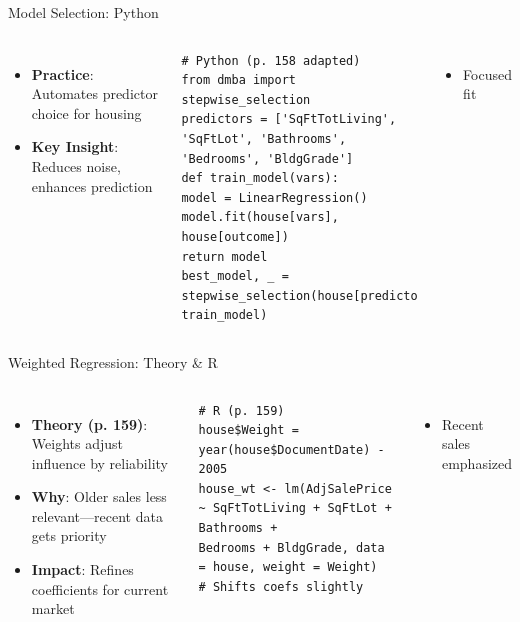 \documentclass{beamer}
\begin{document}
	\begin{frame}[fragile]{Model Selection: Python}
		\lstset{language=Python}
		\begin{columns}
			\begin{itemize}
				\item \textbf{Practice}: Automates predictor choice for housing
				\item \textbf{Key Insight}: Reduces noise, enhances prediction
			\end{itemize}
			\begin{lstlisting}
# Python (p. 158 adapted)
from dmba import stepwise_selection
predictors = ['SqFtTotLiving', 'SqFtLot', 'Bathrooms', 'Bedrooms', 'BldgGrade']
def train_model(vars):
model = LinearRegression()
model.fit(house[vars], house[outcome])
return model
best_model, _ = stepwise_selection(house[predictors].columns, train_model)
			\end{lstlisting}
			\begin{itemize}
				\item Focused fit
			\end{itemize}
		\end{columns}
	\end{frame}
	
	\begin{frame}[fragile]{Weighted Regression: Theory \& R}
		\begin{columns}
			\column{0.6\textwidth}
			\begin{itemize}
				\item \textbf{Theory (p. 159)}: Weights adjust influence by reliability
				\item \textbf{Why}: Older sales less relevant—recent data gets priority
				\item \textbf{Impact}: Refines coefficients for current market
			\end{itemize}
			\begin{lstlisting}
# R (p. 159)
house$Weight = year(house$DocumentDate) - 2005
house_wt <- lm(AdjSalePrice ~ SqFtTotLiving + SqFtLot + Bathrooms +
Bedrooms + BldgGrade, data = house, weight = Weight)
# Shifts coefs slightly
			\end{lstlisting}
			\column{0.4\textwidth}
			\begin{itemize}
				\item Recent sales emphasized
			\end{itemize}
		\end{columns}
	\end{frame}
	
\end{document}
